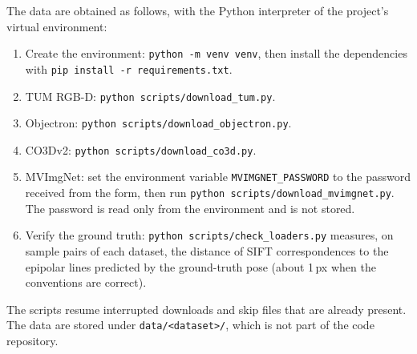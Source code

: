 \documentclass[journal]{IEEEtran}
\begin{document}
The data are obtained as follows, with the Python interpreter of the project's virtual environment:
\begin{enumerate}
  \item Create the environment: \texttt{python -m venv venv}, then install the dependencies with \texttt{pip install -r requirements.txt}.
  \item TUM RGB-D: \texttt{python scripts/download\_tum.py}.
  \item Objectron: \texttt{python scripts/download\_objectron.py}.
  \item CO3Dv2: \texttt{python scripts/download\_co3d.py}.
  \item MVImgNet: set the environment variable \texttt{MVIMGNET\_PASSWORD} to the password received from the form, then run \texttt{python scripts/download\_mvimgnet.py}. The password is read only from the environment and is not stored.
  \item Verify the ground truth: \texttt{python scripts/check\_loaders.py} measures, on sample pairs of each dataset, the distance of SIFT correspondences to the epipolar lines predicted by the ground-truth pose (about 1\,px when the conventions are correct).
\end{enumerate}
The scripts resume interrupted downloads and skip files that are already present. The data are stored under \texttt{data/<dataset>/}, which is not part of the code repository.
\end{document}
